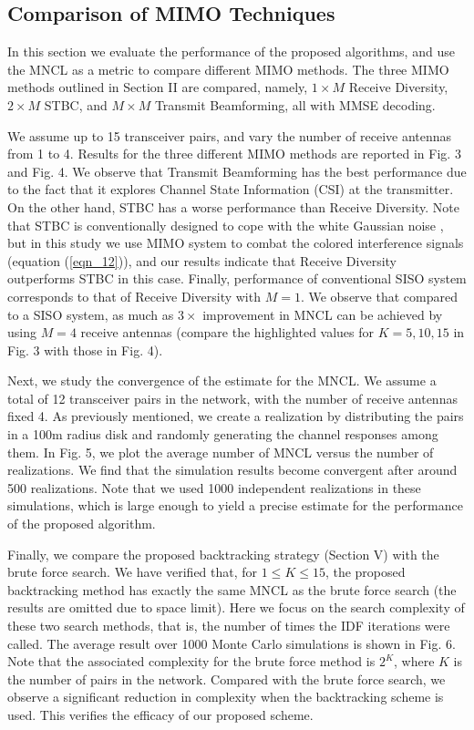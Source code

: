 \documentclass[draftcls,onecolumn,peerview,12pt]{IEEEtran}
\begin{document}
\subsection{Comparison of MIMO Techniques}
In this section we evaluate the performance of the proposed
algorithms, and use the MNCL as a metric to compare different MIMO
methods. The three MIMO methods outlined in Section II are compared,
namely, $1\times M$ Receive Diversity, $2 \times M$ STBC, and $M
\times M$ Transmit Beamforming, all with MMSE decoding.

We assume up to 15 transceiver pairs, and vary the number of receive
antennas from 1 to 4. Results for the three different MIMO methods
are reported in Fig. 3 and Fig. 4. We observe that Transmit
Beamforming has the best performance due to the fact that it
explores Channel State Information (CSI) at the transmitter. On the
other hand, STBC has a worse performance than Receive Diversity.
Note that STBC is conventionally designed to cope with the white
Gaussian noise \cite{17_alamouti}, but in this study we use MIMO
system to combat the colored interference signals (equation
(\ref{eqn_12})), and our results indicate that Receive Diversity
outperforms STBC in this case. Finally, performance of conventional
SISO system corresponds to that of Receive Diversity with $M=1$. We
observe that compared to a SISO system, as much as $3\times$
improvement in MNCL can be achieved by using $M=4$ receive antennas
(compare the highlighted values for $K=5, 10, 15$ in Fig. 3 with
those in Fig. 4).

Next, we study the convergence of the estimate for the MNCL. We
assume a total of 12 transceiver pairs in the network, with the
number of receive antennas fixed 4. As previously mentioned, we
create a realization by distributing the pairs in a 100m radius disk
and randomly generating the channel responses among them. In Fig. 5,
we plot the average number of MNCL versus the number of
realizations. We find that the simulation results become convergent
after around 500 realizations. Note that we used 1000 independent
realizations in these simulations, which is large enough to yield a
precise estimate for the performance of the proposed algorithm.


Finally, we compare the proposed backtracking strategy (Section V)
with the brute force search. We have verified that, for $1\leq K
\leq 15$, the proposed backtracking method has exactly the same MNCL
as the brute force search (the results are omitted due to space
limit). Here we focus on the search complexity of these two search
methods, that is, the number of times the IDF iterations were
called. The average result over 1000 Monte Carlo simulations is
shown in Fig. 6. Note that the associated complexity for the brute
force method is $\mbox{2}^K$, where $K$ is the number of pairs in
the network. Compared with the brute force search, we observe a
significant reduction in complexity when the backtracking scheme is
used. This verifies the efficacy of our proposed scheme.
\end{document}
